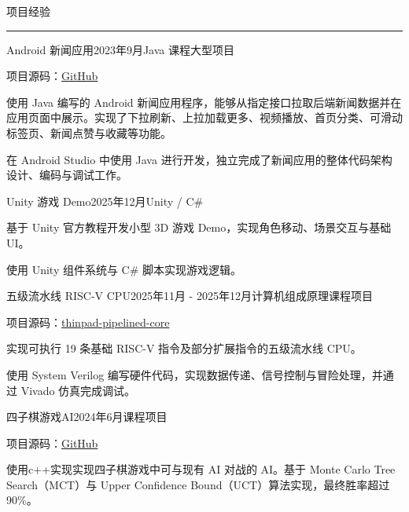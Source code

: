 \documentclass{resume} %
\renewenvironment{rSection}[1]{
\sectionskip
\textcolor{TsinghuaPurple}{\MakeUppercase{#1}}
\sectionlineskip
\hrule
\begin{list}{}{
\setlength{\leftmargin}{0em}
}
\item[]
}{
\end{list}
}
\begin{document}
\begin{rSection}{项目经验}
\begin{rSubsection}{Android 新闻应用}{2023年9月}{Java 课程大型项目}{}
\item 项目源码：\href{https://github.com/Esperarr/My_News}{GitHub}
\item 使用 Java 编写的 Android 新闻应用程序，能够从指定接口拉取后端新闻数据并在应用页面中展示。实现了下拉刷新、上拉加载更多、视频播放、首页分类、可滑动标签页、新闻点赞与收藏等功能。
\item 在 Android Studio 中使用 Java 进行开发，独立完成了新闻应用的整体代码架构设计、编码与调试工作。
\end{rSubsection}

\begin{rSubsection}{Unity 游戏 Demo}{2025年12月}{Unity / C\#}{}
\item 基于 Unity 官方教程开发小型 3D 游戏 Demo，实现角色移动、场景交互与基础 UI。
\item 使用 Unity 组件系统与 C\# 脚本实现游戏逻辑。
\end{rSubsection}

\begin{rSubsection}{五级流水线 RISC-V CPU}{2025年11月 - 2025年12月}{计算机组成原理课程项目}{}
\item 项目源码：\href{https://github.com/Esperarr/thinpad-pipelined-core}{thinpad-pipelined-core}
\item 实现可执行 19 条基础 RISC-V 指令及部分扩展指令的五级流水线 CPU。
\item 使用 System Verilog 编写硬件代码，实现数据传递、信号控制与冒险处理，并通过 Vivado 仿真完成调试。
\end{rSubsection}

\begin{rSubsection}{四子棋游戏AI}{2024年6月}{课程项目}{}
\item 项目源码：\href{https://github.com/Esperarr/Connect4_AI}{GitHub}
\item 使用c++实现实现四子棋游戏中可与现有 AI 对战的 AI。基于 Monte Carlo Tree Search（MCT）与 Upper Confidence Bound（UCT）算法实现，最终胜率超过 90\%。
\end{rSubsection}

\end{rSection}
\end{document}
